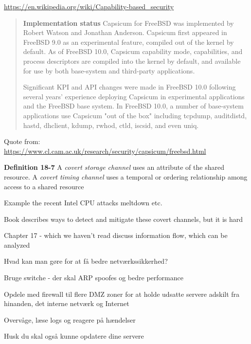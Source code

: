 \documentclass[Screen16to9,17pt]{foils}
\begin{document}
\url{https://en.wikipedia.org/wiki/Capability-based_security}


\begin{quote}{\bf
Implementation status}
Capsicum for FreeBSD was implemented by Robert Watson and Jonathan Anderson. Capsicum first appeared in FreeBSD 9.0 as an experimental feature, compiled out of the kernel by default. As of FreeBSD 10.0, Capsicum capability mode, capabilities, and process descriptors are compiled into the kernel by default, and available for use by both base-system and third-party applications.

Significant KPI and API changes were made in FreeBSD 10.0 following several years' experience deploying Capsicum in experimental applications and the FreeBSD base system. In FreeBSD 10.0, a number of base-system applications use Capsicum "out of the box" including tcpdump, auditdistd, hastd, dhclient, kdump, rwhod, ctld, iscsid, and even uniq.
\end{quote}

Quote from:\\
\url{https://www.cl.cam.ac.uk/research/security/capsicum/freebsd.html}



\begin{list1}
\item {\bf Definition 18-7} A \emph{covert storage channel} uses an attribute of the shared resource. A \emph{covert timing channel} uses a temporal or ordering relationship among access to a shared resource
\item Example the recent Intel CPU attacks meltdown etc.
\item Book describes ways to detect and mitigate these covert channels, but it is hard
\item Chapter 17 - which we haven't read discuss information flow, which can be analyzed
\end{list1}




\begin{list1}
\item Hvad kan man gøre for at få bedre netværkssikkerhed?
\begin{list2}
\item Bruge switche - der skal ARP spoofes og bedre performance
\item Opdele med firewall til flere DMZ zoner for at holde
      udsatte servere adskilt fra hinanden, det interne netværk og
      Internet
\item Overvåge, læse logs og reagere på hændelser
\end{list2}
\item Husk du skal også kunne opdatere dine servere
\end{list1}
\end{document}
